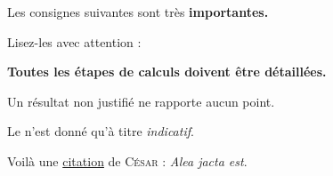 \documentclass[12pt,french]{article}
\begin{document}
Les consignes suivantes sont très \textbf{importantes.}\par
Lisez-les avec attention :\par
{\bfseries
Toutes les étapes de calculs doivent être détaillées.\par
Un résultat non justifié ne rapporte aucun point.
}

Le  n'est donné qu'à titre \textit{indicatif}.

Voilà une \underline{citation} de \textsc{César} : {\itshape Alea jacta est}.
\end{document}
